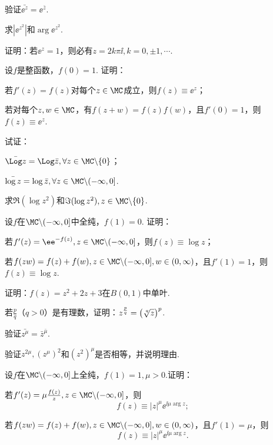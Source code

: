 \begin{xiti}
\item 验证$\bar{\ee^z}=\ee^{\bar z}$.
\item 求$|\ee^{z^2}|$和$\arg \ee^{z^2}$.
\item 证明：若$\ee^z=1$，则必有$z=2k\pi\ii,k=0,\pm1,\cdots$.
\item 设$f$是整函数，$f(0)=1$. 证明：
\begin{enuma}
  \item 若$f'(z)=f(z)$对每个$z\in \MC$成立，则$f(z)\equiv \ee^z$；
  \item 若对每个$z,w\in\MC$，有$f(z+w)=f(z)f(w)$，且$f'(0)=1$，则$f(z)\equiv\ee^z$.
\end{enuma}
\item 试证：
\begin{enuma}
  \item $\bar{\Log z}=\Log \bar z,\forall z\in \MC\backslash\{0\}$；
  \item $\bar{\log z}=\log \bar z,\forall z\in \MC\backslash(-\infty,0]$.
\end{enuma}
\item 求$\Re(\log z^2)$和$\Im(\log z^2),z\in\MC\backslash\{0\}$.
\item 设$f$在$\MC\backslash(-\infty,0]$中全纯，$f(1)=0$. 证明：
\begin{enuma}
  \item 若$f'(z)=\ee^{-f(z)},z\in\MC\backslash(-\infty,0]$，则$f(z)\equiv \log z$；
  \item 若$f(zw)=f(z)+f(w),z\in\MC\backslash(-\infty,0],w\in(0,\infty)$，且$f'(1)=1$，则$f(z)\equiv\log z$.
\end{enuma}
\item 证明：$f(z)=z^2+2z+3$在$B(0,1)$中单叶.
\item 若$\frac pq$（$q>0$）是有理数，证明：$z^{\frac pq}=\big(\sqrt[\leftroot{-1}\uproot{2}q]z\big)^p$.
\item 验证$\bar{z^\mu}=\bar z^{\bar\mu}$.
\item 验证$z^{2\mu},(z^\mu)^2$和$(z^2)^\mu$是否相等，并说明理由.
\item 设$f$在$\MC\backslash(-\infty,0]$上全纯，$f(1)=1,\mu>0$.证明：
\begin{enuma}
  \item 若$f'(z)=\mu\frac{f(z)}z,z\in\MC\backslash(-\infty,0]$，则
  \[f(z)\equiv|z|^\mu\ee^{\ii\mu\arg z};\]
  \item 若$f(zw)=f(z)+f(w),z\in\MC\backslash(-\infty,0],w\in(0,\infty)$，且$f'(1)=\mu$，则
      \[f(z)\equiv |z|^\mu\ee^{\ii\mu\arg z}.\]

\end{enuma}
\end{xiti}
